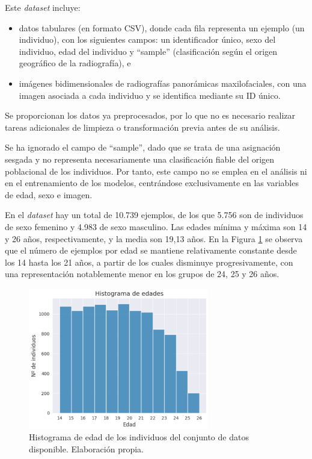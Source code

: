 Este \textit{dataset} incluye:

\begin{itemize}

    \item datos tabulares (en formato CSV), donde cada fila representa un ejemplo (un individuo), con los 
    siguientes campos: un identificador único, sexo del individuo, edad del individuo y ``sample'' 
    (clasificación según el origen geográfico de la radiografía), e

    \item imágenes bidimensionales de radiografías panorámicas maxilofaciales, con una imagen asociada 
    a cada individuo y se identifica mediante su ID único. 

\end{itemize}

Se proporcionan los datos ya preprocesados, por lo que no es necesario realizar tareas adicionales de limpieza 
o transformación previa antes de su análisis.

Se ha ignorado el campo de ``sample'', dado que se trata de una asignación
sesgada y no representa necesariamente una clasificación fiable del origen poblacional de los individuos.
Por tanto, este campo no se emplea en el análisis ni en el entrenamiento de los modelos, centrándose 
exclusivamente en las variables de edad, sexo e imagen.

En el \textit{dataset} hay un total de 10.739 ejemplos, de los que 5.756 son de individuos de sexo femenino 
y 4.983 de sexo masculino. 
Las edades mínima y máxima son 14 y 26 años, respectivamente, y la media son 19,13 años.
En la Figura \ref{fig:histogram_ages} se observa que el número de ejemplos por edad se mantiene relativamente 
constante desde los 14 hasta los 21 años, a partir de los cuales disminuye progresivamente, con una 
representación notablemente menor en los grupos de 24, 25 y 26 años.
 
\begin{figure}[h]
    \centering
    \includegraphics[width=0.7\textwidth]{capitulos/cap_04/imagenes/histogram_ages.png}
    \caption[
        Histograma de edad de los individuos del conjunto de datos disponible.
    ]{
        Histograma de edad de los individuos del conjunto de datos disponible. 
        Elaboración propia.
    } 
    \label{fig:histogram_ages}
\end{figure}

